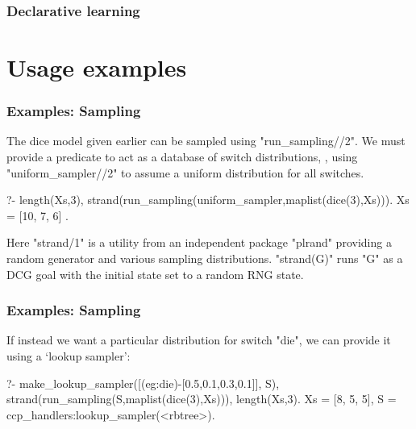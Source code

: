 \documentclass[usenames,dvipsnames]{beamer}
\newenvironment{iframe}[1][untitled]{\begin{frame}\frametitle{#1}}{\end{frame}}
\newenvironment{isframe}[1][untitled]{\begin{frame}[fragile=singleslide,environment=isframe]\frametitle{#1}}{\end{frame}}
\begin{document}
\begin{iframe}[Declarative learning]



\end{iframe}

\section{Usage examples}


\begin{isframe}[Examples: Sampling]
  The dice model given earlier can be sampled using "run_sampling//2". We must
provide a predicate to act as a database of switch distributions, \eg, using "uniform_sampler//2"
to assume a uniform distribution for all switches.
\begin{prolog-barred}
  ?- length(Xs,3),
     strand(run_sampling(uniform_sampler,maplist(dice(3),Xs))).
  Xs = [10, 7, 6] .
\end{prolog-barred}
Here "strand/1" is a utility from an independent package
"plrand" providing a random generator
and various sampling distributions. "strand(G)" runs "G" as a DCG goal with the initial
state set to a random RNG state.
\end{isframe}

\begin{isframe}[Examples: Sampling]
If instead we want a particular distribution for switch "die", we can provide it using
a `lookup sampler':
\begin{prolog-barred}
  ?- make_lookup_sampler([(eg:die)-[0.5,0.1,0.3,0.1]], S),
     strand(run_sampling(S,maplist(dice(3),Xs))),
     length(Xs,3).
  Xs = [8, 5, 5],
  S = ccp_handlers:lookup_sampler(<rbtree>).
\end{prolog-barred}
\end{isframe}
\end{document}
